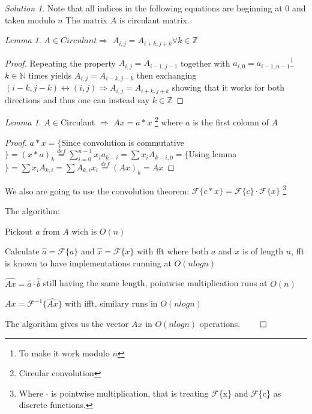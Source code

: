 \documentclass[a4paper,twoside=false,abstract=false,numbers=noenddot,
titlepage=false,headings=small,parskip=half,version=last]{scrartcl}
\theoremstyle{definition}
\theoremstyle{remark}
\newtheorem*{solution}{Solution}
\newtheorem{lemma}[theorem]{Lemma}
\newcommand{\NN}{\ensuremath{\mathbb{N}}}
\newcommand{\ZZ}{\ensuremath{\mathbb{Z}}}
\newcommand{\Fourier}{\ensuremath{\mathcal{F}}}
\begin{document}
\begin{solution}
Note that all indices in the following equations are beginning at $0$ and taken modulo $n$ 
The matrix $A$ is circulant matrix.
\begin{lemma} \label{Slider}
    $A \in Circulant \Rightarrow$ $A_{i,j}=A_{i+k,j+k} \forall k \in \ZZ$ 
\end{lemma}
\begin{proof}
    Repeating the property $A_{i,j}=A_{i-1,j-1}$ together with 
    $a_{i,0}=a_{i-1,n-1}$\footnote{To make it work modulo $n$} $k \in \NN$
    times yields $A_{i,j}=A_{i-k,j-k}$
    then exchanging $(i-k,j-k) \leftrightarrow (i,j) \Rightarrow A_{i,j}=A_{i+k,j+k}$
    showing that it works for both directions and thus one can instead say $k \in \ZZ$
\end{proof}
\begin{lemma}
    $A \in $Circulant $\Rightarrow$
    $Ax = a \ast x $ \footnote{Circular convolution} where $a$ is the first colomn of $A$
    \end{lemma}
\begin{proof}
    $a \ast x = \{$Since convolution is commutative$\} = (x \ast a)_k \stackrel{def}{=} 
    \displaystyle\sum_{i=0}^{n-1}{x_i a_{k-i}} = \sum{x_i A_{k-i,0}} = \{$Using lemma$\} = \sum x_i A_{k,i} = \sum A_{k,i} x_i \stackrel{def}{=} (Ax)_k = Ax$
\end{proof}

We also are going to use the convolution theorem:
$\Fourier\{c \ast x\}=\Fourier\{c\} \cdot \Fourier\{x\}$
\footnote{Where $\cdot$ is pointwise multiplication,
that is treating \Fourier\{x\} and \Fourier\{c\} as discrete functions.} 

The algorithm:
\begin{list}{*}{}
 \item Pickout $a$ from $A$ wich is $O(n)$
 \item Calculate $\hat{a}=\Fourier\{a\}$ and $\hat{x}=\Fourier\{x\}$ 
 with fft where both $a$ and $x$ is of length $n$, fft is known to have implementations running at $O(nlogn)$
 \item $\widehat{Ax} = \hat{a} \cdot \hat{b}$ still having the same length, pointwise multiplication runs at $O(n)$
 \item $Ax = \Fourier^{-1}\{\widehat{Ax}\}$ with ifft, similary runs in $O(nlogn)$ 
\end{list}

The algorithm gives us the vector $Ax$ in $O(nlogn)$ operations. $\qed$

\end{solution}
\end{document}

